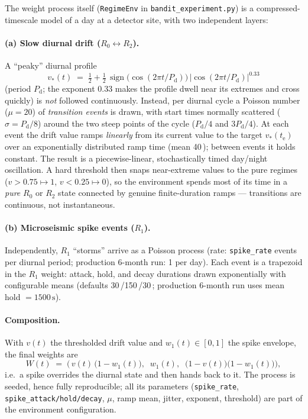 \documentclass[11pt,a4paper]{article}
\newcommand{\SI}[2]{#1\,\text{#2}}
\newcommand{\code}[1]{\texttt{#1}}
\begin{document}
The weight process itself (\code{RegimeEnv} in \code{bandit\_experiment.py}) is a
compressed-timescale model of a day at a detector site, with two independent layers:

\paragraph{(a) Slow diurnal drift ($R_0 \leftrightarrow R_2$).}
A ``peaky'' diurnal profile
\begin{equation}
  v_\ast(t) \;=\; \tfrac12 + \tfrac12\,\operatorname{sign}\!\big(\cos(2\pi t/P_{\mathrm d})\big)\,
  \big\lvert \cos(2\pi t / P_{\mathrm d}) \big\rvert^{0.33}
\end{equation}
(period $P_{\mathrm d}$; the exponent $0.33$ makes the profile dwell near its extremes
and cross quickly) is \emph{not} followed continuously. Instead, per diurnal cycle a
Poisson number ($\mu = 20$) of \emph{transition events} is drawn, with start times
normally scattered ($\sigma = P_{\mathrm d}/8$) around the two steep points of the cycle
($P_{\mathrm d}/4$ and $3P_{\mathrm d}/4$). At each event the drift value ramps
\emph{linearly} from its current value to the target $v_\ast(t_{\mathrm e})$ over an
exponentially distributed ramp time (mean \SI{40}{s}); between events it holds constant.
The result is a piecewise-linear, stochastically timed day/night oscillation. A hard
threshold then snaps near-extreme values to the pure regimes ($v > 0.75 \mapsto 1$,
$v<0.25\mapsto 0$), so the environment spends most of its time in a \emph{pure} $R_0$ or
$R_2$ state connected by genuine finite-duration ramps --- transitions are continuous,
not instantaneous.

\paragraph{(b) Microseismic spike events ($R_1$).}
Independently, $R_1$ ``storms'' arrive as a Poisson process (rate: \code{spike\_rate}
events per diurnal period; production 6-month run: 1 per day). Each event is a trapezoid
in the $R_1$ weight: attack, hold, and decay durations drawn exponentially with
configurable means (defaults \SI{30}{s}/\SI{150}{s}/\SI{30}{s}; production 6-month run
uses mean hold $=\SI{1500}{s}$).

\paragraph{Composition.} With $v(t)$ the thresholded drift value and $w_1(t)\in[0,1]$
the spike envelope, the final weights are
\begin{equation}
  \label{eq:W}
  W(t) \;=\; \Big( \, v(t)\,\big(1-w_1(t)\big),\;\; w_1(t),\;\; \big(1-v(t)\big)\big(1-w_1(t)\big) \Big),
\end{equation}
i.e.\ a spike overrides the diurnal state and then hands back to it. The process is
seeded, hence fully reproducible; all its parameters (\code{spike\_rate},
\code{spike\_attack/hold/decay}, $\mu$, ramp mean, jitter, exponent, threshold) are part
of the environment configuration.
\end{document}
